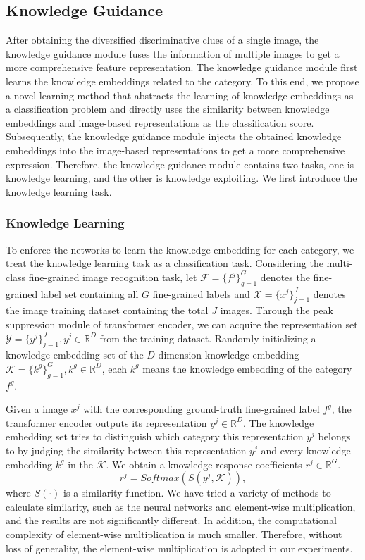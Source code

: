 \documentclass[5p,twocolumn]{elsarticle}
\begin{document}
\subsection{Knowledge Guidance} \label{sec.kg}

After obtaining the diversified discriminative clues of a single image, the knowledge guidance module fuses the information of multiple images to get a more comprehensive feature representation. The knowledge guidance module first learns the knowledge embeddings related to the category. To this end, we propose a novel learning method that abstracts the learning of knowledge embeddings as a classification problem and directly uses the similarity between knowledge embeddings and image-based representations as the classification score. Subsequently, the knowledge guidance module injects the obtained knowledge embeddings into the image-based representations to get a more comprehensive expression. Therefore, the knowledge guidance module contains two tasks, one is knowledge learning, and the other is knowledge exploiting. We first introduce the knowledge learning task.

\subsubsection{Knowledge Learning} 
To enforce the networks to learn the knowledge embedding for each category, we treat the knowledge learning task as a classification task. 
Considering the multi-class fine-grained image recognition task, let $\mathcal{F}=\{f^{g}\}_{g=1}^{G}$ denotes the fine-grained label set containing all $G$ fine-grained labels and  $\mathcal{X}=\{x^j\}_{j=1}^{J}$ denotes the image training dataset containing the total $J$ images. Through the peak suppression module of transformer encoder, we can acquire the representation set $\mathcal{Y}=\{y^j\}_{j=1}^{J},y^j \in \mathbb{R}^D$ from the training dataset.
Randomly initializing a knowledge embedding set of the $D$-dimension knowledge embedding $\mathcal{K} =\{k^{g}\}^G_{g=1}, k^{g} \in \mathbb{R}^D$, each $k^{g}$ means the knowledge embedding of the category $f^{g}$.

Given a image $x^{j}$ with the corresponding ground-truth fine-grained label $f^{g}$, the transformer encoder outputs its representation $y^j \in \mathbb{R}^D$. 
The knowledge embedding set tries to distinguish which category this representation $y^j$ belongs to by judging the similarity between this representation $y^j$ and every knowledge embedding $k^{g}$ in the $\mathcal{K}$. We obtain a knowledge response coefficients $r^j \in \mathbb{R}^G$.
\begin{equation}\label{equ.response}
r^j= Softmax(S(y^j,\mathcal{K})),
\end{equation}
where $S(\cdot)$ is a similarity function. We have tried a variety of methods to calculate similarity, such as the neural networks and element-wise multiplication, and the results are not significantly different. In addition, the computational complexity of element-wise multiplication is much smaller. Therefore, without loss of generality, the element-wise multiplication is adopted in our experiments.
\end{document}
